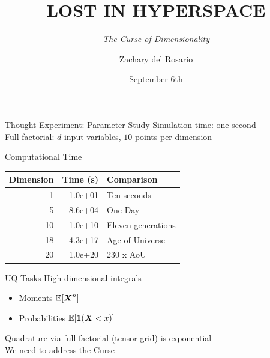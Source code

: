 \documentclass[14pt]{beamer}
\title{LOST IN HYPERSPACE}
\subtitle{\emph{The Curse of Dimensionality}}
\author{Zachary del Rosario}
\institute{zdr@stanford.edu}
\date{September 6th}
\begin{document}
\begin{frame}[plain]
\maketitle
\end{frame}

\begin{frame}[t]{Thought Experiment: Parameter Study}
  Simulation time: one second \\
  Full factorial: $d$ input variables, $10$ points per dimension \\

  \bigskip
\end{frame}

\begin{frame}{Computational Time}
  \begin{table}
    \begin{tabular}{r|r|l}
    \hline
    Dimension & Time (s) & Comparison\\
    \hline
    1 & 1.0e+01 & Ten seconds\\
    \hline
    5 & 8.6e+04 & One Day\\
    \hline
    10 & 1.0e+10 & Eleven generations\\
    \hline
    18 & 4.3e+17 & Age of Universe\\
    \hline
    20 & 1.0e+20 & 230 x AoU\\
    \hline
    \end{tabular}
  \end{table}
\end{frame}

\begin{frame}{UQ Tasks}
  High-dimensional integrals
  \begin{itemize}
  \item Moments $\mathbb{E}[\boldsymbol{X}^n]$
  \item Probabilities $\E[\i1(\mX<x)]$
  \end{itemize}

  \bigskip Quadrature via full factorial (tensor grid) is exponential \\
  We need to address the Curse
\end{frame}
\end{document}
